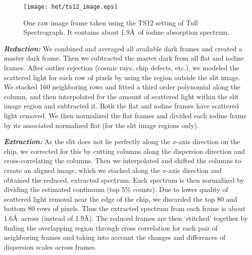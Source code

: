 \begin{figure}
\centering
\texttt{[image: het/ts12\_image.eps]}
\caption{One raw image frame taken using the TS12 setting of Tull
  Spectrograph. It contains about 1.9\AA\ of iodine absorption spectrum. 
\label{het:fig:ts12image}}
\end{figure}


\textbf{\textit{Reduction:}} We combined and averaged all available
dark frames and created a master dark frame. Then we subtracted the
master dark from all flat and iodine frames. After outlier rejection
(cosmic rays, chip defects, etc.), we modeled the scattered light for
each row of pixels by using the region outside the slit image.  We
stacked 160 neighboring rows and fitted a third order polynomial along
the column, and then interpolated for the amount of scattered light
within the slit image region and subtracted it. Both the flat and
iodine frames have scattered light removed. We then normalized the
flat frames and divided each iodine frame by its associated normalized
flat (for the slit image regions only).

\textbf{\textit{Extraction:}} As the slit does not lie perfectly along
the $x$-axis direction on the chip, we corrected for this by cutting
columns along the dispersion direction and cross-correlating the
columns. Then we interpolated and shifted the columns to create an
aligned image, which we stacked along the $x$-axis direction and
obtained the reduced, extracted spectrum. Each spectrum is then
normalized by dividing the estimated continuum (top 5\% counts). Due
to lower quality of scattered light removal near the edge of the chip,
we discarded the top 80 and bottom 80 rows of pixels. Thus the
extracted spectrum from each frame is about 1.6\AA\ across (instead of
1.9\AA). The reduced frames are then `stitched' together by finding
the overlapping region through cross correlation for each pair of
neighboring frames and taking into account the changes and differences
of dispersion scales across frames.


